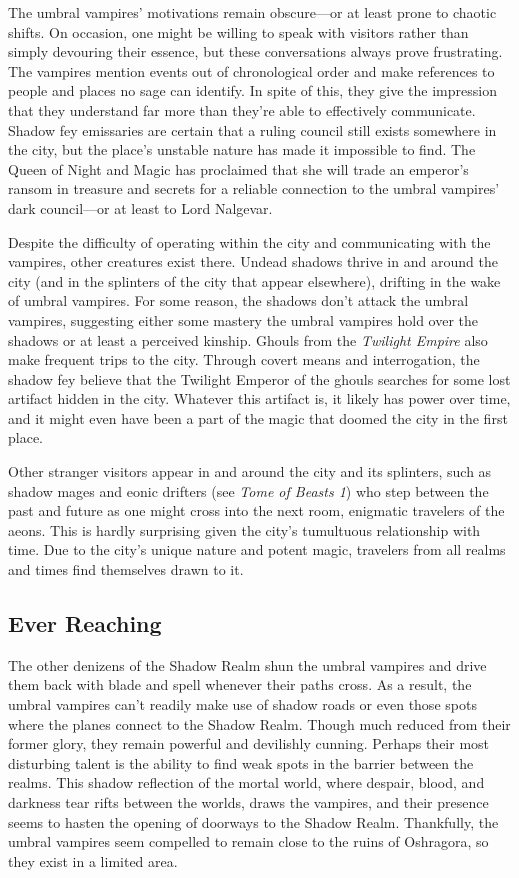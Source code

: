 \documentclass[10pt,a4paper,twoside,bg=print,twocolumn,openany,nodeprecatedcode]{dndbook}
\begin{document}
The umbral vampires' motivations remain obscure—or at least prone to chaotic shifts. On occasion, one might be willing to speak with visitors rather than simply devouring their essence, but these conversations always prove frustrating. The vampires mention events out of chronological order and make references to people and places no sage can identify. In spite of this, they give the impression that they understand far more than they're able to effectively communicate. Shadow fey emissaries are certain that a ruling council still exists somewhere in the city, but the place's unstable nature has made it impossible to find. The Queen of Night and Magic has proclaimed that she will trade an emperor's ransom in treasure and secrets for a reliable connection to the umbral vampires' dark council—or at least to Lord Nalgevar.

Despite the difficulty of operating within the city and communicating with the vampires, other creatures exist there. Undead shadows thrive in and around the city (and in the splinters of the city that appear elsewhere), drifting in the wake of umbral vampires. For some reason, the shadows don't attack the umbral vampires, suggesting either some mastery the umbral vampires hold over the shadows or at least a perceived kinship. Ghouls from the \textit{Twilight Empire} also make frequent trips to the city. Through covert means and interrogation, the shadow fey believe that the Twilight Emperor of the ghouls searches for some lost artifact hidden in the city. Whatever this artifact is, it likely has power over time, and it might even have been a part of the magic that doomed the city in the first place.

Other stranger visitors appear in and around the city and its splinters, such as shadow mages and eonic drifters (see \textit{Tome of Beasts 1}) who step between the past and future as one might cross into the next room, enigmatic travelers of the aeons. This is hardly surprising given the city's tumultuous relationship with time. Due to the city's unique nature and potent magic, travelers from all realms and times find themselves drawn to it.

\subsection{Ever Reaching}
The other denizens of the Shadow Realm shun the umbral vampires and drive them back with blade and spell whenever their paths cross. As a result, the umbral vampires can't readily make use of shadow roads or even those spots where the planes connect to the Shadow Realm. Though much reduced from their former glory, they remain powerful and devilishly cunning. Perhaps their most disturbing talent is the ability to find weak spots in the barrier between the realms. This shadow reflection of the mortal world, where despair, blood, and darkness tear rifts between the worlds, draws the vampires, and their presence seems to hasten the opening of doorways to the Shadow Realm. Thankfully, the umbral vampires seem compelled to remain close to the ruins of Oshragora, so they exist in a limited area.
\end{document}
